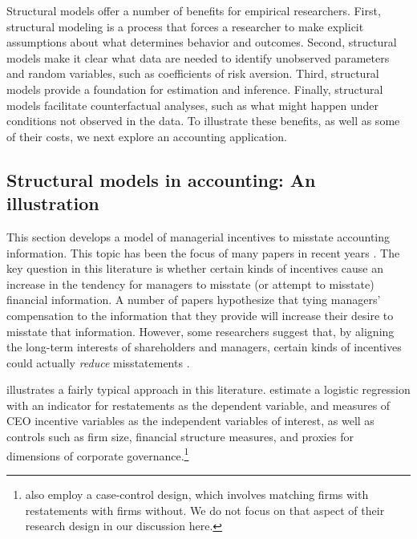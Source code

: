 Structural models offer a number of benefits for empirical researchers.
First, structural modeling is a process that forces a researcher to make explicit assumptions about what determines behavior and outcomes. 
Second, structural models make it clear what data are needed to identify unobserved parameters and random variables, such as coefficients of risk aversion.
Third, structural models provide a foundation for estimation and inference. 
Finally, structural models facilitate counterfactual analyses, such as what might happen under conditions not observed in the data. 
To illustrate these benefits, as well as some of their costs, we next explore an accounting application.

\subsection{Structural models in accounting: An illustration}
This section develops a model of managerial incentives to misstate accounting information. 
This topic has been the focus of many papers in recent years \citep[see][]{Armstrong:2010jd}.
The key question in this literature is whether certain kinds of incentives cause an increase in the tendency for managers to misstate (or attempt to misstate) financial information.
A number of papers hypothesize that tying managers' compensation to the information that they provide will increase their desire to misstate that information.
However, some researchers suggest that, by aligning the long-term interests of shareholders and managers, certain kinds of incentives could actually \emph{reduce} misstatements \citep{Burns:2006ce}.

\citet{Efendi:2007ja} illustrates a fairly typical approach in this literature. 
\citet[p.\,687]{Efendi:2007ja} estimate a logistic regression with an indicator for restatements as the dependent variable, and measures of CEO incentive variables as the independent variables of interest, as well as controls such as firm size, financial structure measures, and proxies for dimensions of corporate governance.\footnote{
\citet{Efendi:2007ja} also employ a case-control design, which involves matching firms with restatements with firms without.
We do not focus on that aspect of their research design in our discussion here.}
 
